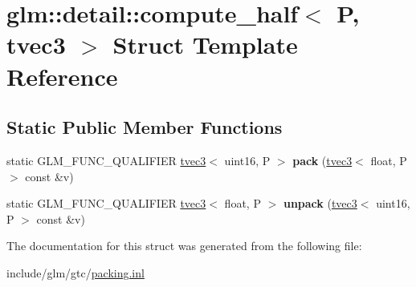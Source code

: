 \hypertarget{structglm_1_1detail_1_1compute__half_3_01P_00_01tvec3_01_4}{}\section{glm\+:\+:detail\+:\+:compute\+\_\+half$<$ P, tvec3 $>$ Struct Template Reference}
\label{structglm_1_1detail_1_1compute__half_3_01P_00_01tvec3_01_4}
\subsection*{Static Public Member Functions}
\begin{DoxyCompactItemize}
\item 
\mbox{\label{structglm_1_1detail_1_1compute__half_3_01P_00_01tvec3_01_4_a329d076df25a395e8d4872384ca17221}} 
static G\+L\+M\+\_\+\+F\+U\+N\+C\+\_\+\+Q\+U\+A\+L\+I\+F\+I\+ER \hyperlink{structglm_1_1tvec3}{tvec3}$<$ uint16, P $>$ {\bfseries pack} (\hyperlink{structglm_1_1tvec3}{tvec3}$<$ float, P $>$ const \&v)
\item 
\mbox{\label{structglm_1_1detail_1_1compute__half_3_01P_00_01tvec3_01_4_a48226a2ef3176a5fbf6bbad330180517}} 
static G\+L\+M\+\_\+\+F\+U\+N\+C\+\_\+\+Q\+U\+A\+L\+I\+F\+I\+ER \hyperlink{structglm_1_1tvec3}{tvec3}$<$ float, P $>$ {\bfseries unpack} (\hyperlink{structglm_1_1tvec3}{tvec3}$<$ uint16, P $>$ const \&v)
\end{DoxyCompactItemize}


The documentation for this struct was generated from the following file\+:\begin{DoxyCompactItemize}
\item 
include/glm/gtc/\hyperlink{packing_8inl}{packing.\+inl}\end{DoxyCompactItemize}
